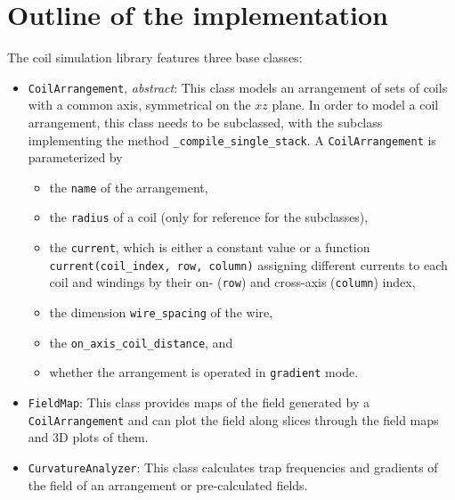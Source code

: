 \section*{Outline of the implementation}
The coil simulation library features three base classes:
\begin{itemize}
    \item \texttt{CoilArrangement}, \textit{abstract}: This class models an arrangement of sets of coils with a common axis, symmetrical on the $xz$ plane. In order to model a coil arrangement, this class needs to be subclassed, with the subclass implementing the method \texttt{\_compile\_single\_stack}. A \texttt{CoilArrangement} is parameterized by
    \begin{itemize}
        \item the \texttt{name} of the arrangement,
        \item the \texttt{radius} of a coil (only for reference for the subclasses),
        \item the \texttt{current}, which is either a constant value or a function \texttt{current(coil\_index, row, column)} assigning different currents to each coil and windings by their on- (\texttt{row}) and cross-axis (\texttt{column}) index,
        \item the dimension \texttt{wire\_spacing} of the wire,
        \item the \texttt{on\_axis\_coil\_distance}, and
        \item whether the arrangement is operated in \texttt{gradient} mode.
    \end{itemize}
    \item \texttt{FieldMap}: This class provides maps of the field generated by a \texttt{CoilArrangement} and can plot the field along slices through the field maps and 3D plots of them.
    \item \texttt{CurvatureAnalyzer}: This class calculates trap frequencies and gradients of the field of an arrangement or pre-calculated fields.
\end{itemize}

